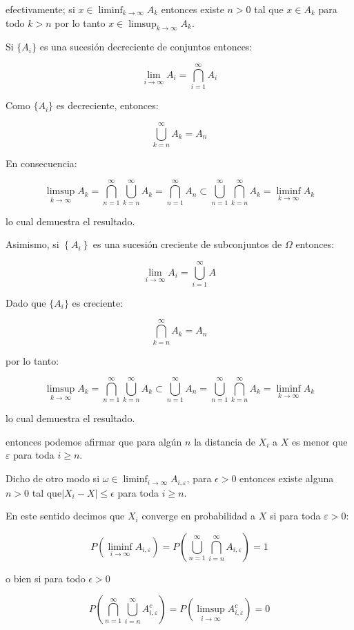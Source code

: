 \documentclass{extreport}
\theoremstyle{definicion}
\theoremstyle{propiedad}
\begin{document}
efectivamente; si $x\in \liminf_{k\rightarrow\infty}A_k$ entonces existe $n>0$ tal que $x\in A_k$  para todo $k>n$ por lo tanto $x\in \limsup_{k\rightarrow\infty}A_k$.

Si $\{A_i\}$  es una sucesión decreciente de conjuntos entonces:

$$
\lim_{i\rightarrow \infty}A_i = \bigcap_{i=1}^\infty A_i
$$

Como $\{A_i\}$ es decreciente, entonces:

$$
\bigcup_{k=n}^\infty A_k = A_n
$$

En consecuencia:

$$
\limsup_{k\rightarrow \infty} A_k = \bigcap_{n=1}^\infty\bigcup_{k=n}^\infty A_k = \bigcap_{n=1}^\infty A_n\subset \bigcup_{n=1}^\infty\bigcap_{k=n}^\infty A_k = \liminf_{k\rightarrow\infty}A_k
$$

lo cual demuestra el resultado.

Asimismo, si $\left\{A_i\right\}$ es una sucesión creciente de subconjuntos de $\Omega$ entonces:

$$
\lim_{i\rightarrow\infty}A_i = \bigcup_{i=1}^\infty A
$$

Dado que $\{A_i\}$ es creciente:

$$
\bigcap_{k=n}^\infty A_k= A_n 
$$

por lo tanto:

$$
\limsup_{k\rightarrow\infty}A_k = \bigcap_{n=1}^\infty\bigcup_{k=n}^\infty A_k \subset \bigcup_{n= 1}^\infty A_n = \bigcup_{n=1}^\infty\bigcap_{k=n}^\infty A_k = \liminf_{k\rightarrow\infty} A_k
$$

lo cual demuestra el resultado.



entonces podemos afirmar que para algún $n$ la distancia de $X_i$ a $X$ es menor que $\varepsilon$ para toda $i\geq n$. 

Dicho de otro modo si $\omega \in \liminf_{i\rightarrow \infty} A_{i,\varepsilon}$, para $\epsilon>0$ entonces existe alguna $n>0$ tal que$\left|X_i-X\right| \leq \epsilon$ para toda $i\geq n$. 

En este sentido decimos que $X_i$ converge en probabilidad a $X$  si para toda $\varepsilon>0$:

$$
P\left(\liminf_{i\rightarrow \infty}A_{i,\varepsilon}\right) = P\left(\bigcup_{n=1}^\infty\bigcap_{i=n}^\infty A_{i,\varepsilon}\right)= 1
$$

o bien si para todo $\epsilon > 0$

$$
P\left(\bigcap_{n=1}^\infty\bigcup_{i=n}^\infty A^c_{i,\varepsilon}\right) = P\left(\limsup_{i\rightarrow\infty}A^c_{i,\varepsilon}\right) = 0
$$
\end{document}

